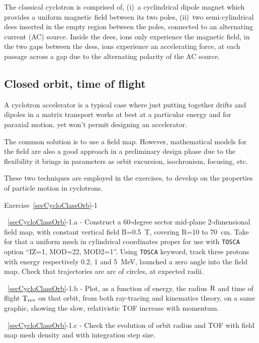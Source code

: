 The classical cyclotron  is comprised of, (i)~a cyclindrical dipole magnet which provides a uniform 
 magnetic field between its two poles, (ii)~two semi-cylindrical dees inserted 
in the empty region between the  poles, connected to an alternating current (AC) source. 
Inside the dees, ions only experience the magnetic field, in the two gaps between the dess, ions 
experience an accelerating force, at each passage across a gap due to the alternating polarity of the AC source.



\subsection{Closed orbit, time of flight \label{secCycloClassOrb}}

A cyclotron accelerator is a typical case 
where just putting together drifts and dipoles in a matrix transport works at best 
at a particular energy and for paraxial motion, yet won't permit designing an accelerator. 

The common solution is to use a field map. However, mathematical models for the field 
are also a good approach in a preliminary design phase due to the flexibility it brings 
in parameters as orbit excursion, isochronism, focusing, etc.

These two techniques are employed  in the exercises, to develop on the properties of particle motion 
in cyclotrons. 

\smallskip
\noindent {\small $\bullet$} Exercise~\ref{secCycloClassOrb}-1 

\noindent ~\ref{secCycloClassOrb}-1.a - 
Construct a 60-degree sector mid-plane 2-dimensional field map, with constant vertical field 
B=0.5~T, covering R=10 to 70~cm. Take for that a uniform mesh in cylindrical coordinates proper for use 
with \texttt{TOSCA} option ``IZ=1, MOD=22, MOD2=1''. 
Using \texttt{TOSCA} keyword, track three protons with energy respectively 0.2, 1 and 5~MeV,
launched a zero angle into the field map. 
Check that trajectories are arc of circles, at expected radii. 

\noindent ~\ref{secCycloClassOrb}-1.b - 
 Plot, as a function of energy, the 
  radius $\rm R$ and  time of flight $\rm T_{\rm rev}$ on that orbit, 
 from both ray-tracing and kinematics theory, on a same graphic, 
showing   the slow, relativistic TOF increase with momentum. 

\noindent ~\ref{secCycloClassOrb}-1.c - 
Check the evolution of orbit radius and TOF  with field map mesh density and with 
integration step size.



